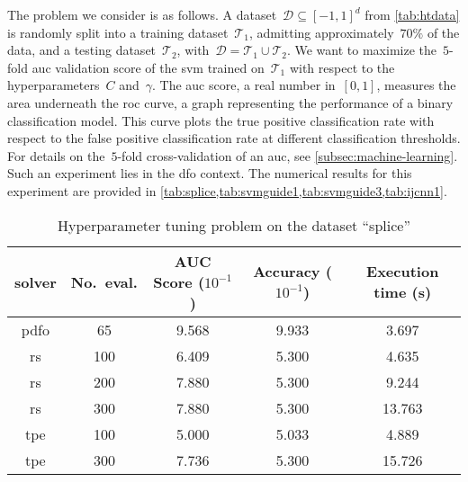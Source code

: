 The problem we consider is as follows.
A dataset~$\mathcal{D} \subseteq [-1, 1]^d$ from \cref{tab:htdata} is randomly split into a training dataset~$\mathcal{T}_1$, admitting approximately~$70\%$ of the data, and a testing dataset~$\mathcal{T}_2$, with~$\mathcal{D} = \mathcal{T}_1 \cup \mathcal{T}_2$.
We want to maximize the~$5$-fold \gls{auc} validation score of the \gls{svm} trained on~$\mathcal{T}_1$ with respect to the hyperparameters~$C$ and~$\gamma$.
The \gls{auc} score, a real number in~$[0, 1]$, measures the area underneath the \gls{roc} curve, a graph representing the performance of a binary classification model.
This curve plots the true positive classification rate with respect to the false positive classification rate at different classification thresholds.
For details on the~$5$-fold cross-validation of an \gls{auc}, see \cref{subsec:machine-learning}.
Such an experiment lies in the \gls{dfo} context.
The numerical results for this experiment are provided in \cref{tab:splice,tab:svmguide1,tab:svmguide3,tab:ijcnn1}.

\begin{table}[!ht]
    \caption{Hyperparameter tuning problem on the dataset \enquote{splice}}
    \label{tab:splice}
    \centering
    \begin{tabular}{cS[table-parse-only]SSS}
        \toprule
        solver      & {No.\ eval.}  & {AUC Score ($10^{-1}$)}   & {Accuracy ($10^{-1}$)}    & {Execution time (\si{\second})}\\
        \midrule
        \gls{pdfo}  & 65            & 9.568                     & 9.933                     & 3.697\\
        \gls{rs}    & 100           & 6.409                     & 5.300                     & 4.635\\
        \gls{rs}    & 200           & 7.880                     & 5.300                     & 9.244\\
        \gls{rs}    & 300           & 7.880                     & 5.300                     & 13.763\\
        \gls{tpe}   & 100           & 5.000                     & 5.033                     & 4.889\\
        \gls{tpe}   & 300           & 7.736                     & 5.300                     & 15.726\\
        \bottomrule
    \end{tabular}
\end{table}

